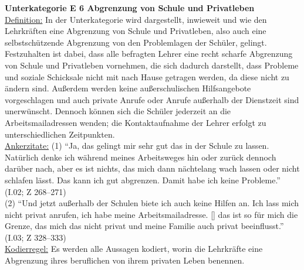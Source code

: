 \textbf{Unterkategorie E 6 Abgrenzung von Schule und Privatleben}\\
\underline{Definition:} In der Unterkategorie wird dargestellt, inwieweit und wie den Lehrkräften eine Abgrenzung von Schule und Privatleben, also auch eine selbstschützende Abgrenzung von den Problemlagen der Schüler, gelingt. Festzuhalten ist dabei, dass alle befragten Lehrer eine recht scharfe Abgrenzung von Schule und Privatleben vornehmen, die sich dadurch darstellt, dass Probleme und soziale Schicksale nicht mit nach Hause getragen werden, da diese nicht zu ändern sind. Außerdem werden keine außerschulischen Hilfsangebote vorgeschlagen und auch private Anrufe oder Anrufe außerhalb der Dienstzeit sind unerwünscht. Dennoch können sich die Schüler jederzeit an die Arbeitsmailadressen wenden; die Kontaktaufnahme der Lehrer erfolgt zu unterschiedlichen Zeitpunkten.\\
\underline{Ankerzitate:} (1) "`Ja, das gelingt mir sehr gut das in der Schule zu lassen. Natürlich denke ich während meines Arbeitsweges hin oder zurück dennoch darüber nach, aber es ist nichts, das mich dann nächtelang wach lassen oder nicht schlafen lässt. Das kann ich gut abgrenzen. Damit habe ich keine Probleme."' (I.02; Z 268--271)\\ (2) "`Und jetzt außerhalb der Schulen biete ich auch keine Hilfen an. Ich lass mich nicht privat anrufen, ich habe meine Arbeitsmailadresse. [\punkte] das ist so für mich die Grenze, das mich das nicht privat und meine Familie auch privat beeinflusst."' (I.03; Z 328--333)\\
\underline{Kodierregel:} Es werden alle Aussagen kodiert, worin die Lehrkräfte eine Abgrenzung ihres beruflichen von ihrem privaten Leben benennen.\\

